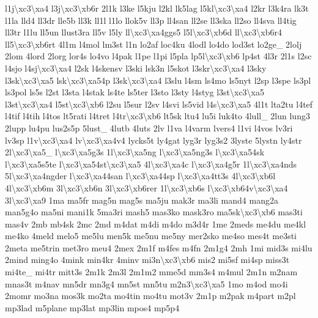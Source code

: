 \begin{DoxyCompactItemize}
l1j\textbackslash{}xc3\textbackslash{}xa4 l3j\textbackslash{}xc3\textbackslash{}xb6r 2l1k l3ke l5kju l2kl lk5lag l5kl\textbackslash{}xc3\textbackslash{}xa4 l2kr l3k4ra lk3t l1la lld4 ll3dr lle5b ll3k ll1l l1lo llok5v ll3p ll4san ll2se ll3ska ll2so ll4sva ll4tig ll3tr l1lu ll5un llust3ra ll5v l5ly ll\textbackslash{}xc3\textbackslash{}xa4ggs5 l5l\textbackslash{}xc3\textbackslash{}xb6d ll\textbackslash{}xc3\textbackslash{}xb6r4 ll5\textbackslash{}xc3\textbackslash{}xb6rt 4l1m l4mol lm3st l1n lo2af loc4ku 4lodl lo4do lod3st lo2ge\-\_\- 2lolj 2lom 4lord 2lorg lor4s lo4vo l4pak l1pe l1pi l5pla lp5l\textbackslash{}xc3\textbackslash{}xb6 lp4st 4l3r 2l1s l2sc l4sjo l4sj\textbackslash{}xc3\textbackslash{}xa4 l2sk l4skensv l3ski lsk3n l5skot l3skr\textbackslash{}xc3\textbackslash{}xa4 l3sky l3sk\textbackslash{}xc3\textbackslash{}xa5 lsk\textbackslash{}xc3\textbackslash{}xa54p l3sk\textbackslash{}xc3\textbackslash{}xa4 l3slu l4sm ls4mo ls5nyt l2sp l3spe ls3pl ls3pol ls5s l2st l3sta l4stak ls4te ls5ter l3sto l3sty l4styg l3st\textbackslash{}xc3\textbackslash{}xa5 l3st\textbackslash{}xc3\textbackslash{}xa4 l5st\textbackslash{}xc3\textbackslash{}xb6 l2su l5sur l2sv l4svi ls5vid l4s\textbackslash{}xc3\textbackslash{}xa5 4l1t lta2tu l4tef l4tif l4tih l4tos lt5rati l4tret l4tr\textbackslash{}xc3\textbackslash{}xb6 lt5sk ltu4 lu5i luk4to 4lull\-\_\- 2lun lung3 2lupp lu4pu lus2s5p 5lust\-\_\- 4lutb 4luts 2lv l1va l4varm lvers4 l1vi l4vos lv3ri lv3sp l1v\textbackslash{}xc3\textbackslash{}xa4 lv\textbackslash{}xc3\textbackslash{}xa4v4 lycks5t ly4gat lyg3r lyg3s2 3lyste 5lystn ly4str 2l\textbackslash{}xc3\textbackslash{}xa5\-\_\- l\textbackslash{}xc3\textbackslash{}xa5g3s 1l\textbackslash{}xc3\textbackslash{}xa5ng l\textbackslash{}xc3\textbackslash{}xa5ng3s l\textbackslash{}xc3\textbackslash{}xa54sk l\textbackslash{}xc3\textbackslash{}xa5s5te l\textbackslash{}xc3\textbackslash{}xa54st\textbackslash{}xc3\textbackslash{}xa5 4l\textbackslash{}xc3\textbackslash{}xa4c l\textbackslash{}xc3\textbackslash{}xa4g5r 1l\textbackslash{}xc3\textbackslash{}xa4nds 5l\textbackslash{}xc3\textbackslash{}xa4ngder l\textbackslash{}xc3\textbackslash{}xa44san l\textbackslash{}xc3\textbackslash{}xa44sp l\textbackslash{}xc3\textbackslash{}xa4tt3s 4l\textbackslash{}xc3\textbackslash{}xb6l 4l\textbackslash{}xc3\textbackslash{}xb6m 3l\textbackslash{}xc3\textbackslash{}xb6n 3l\textbackslash{}xc3\textbackslash{}xb6rer 1l\textbackslash{}xc3\textbackslash{}xb6s l\textbackslash{}xc3\textbackslash{}xb64v\textbackslash{}xc3\textbackslash{}xa4 3l\textbackslash{}xc3\textbackslash{}xa9 1ma ma5fr mag5n mag5s ma5ju mak3r ma3li mand4 mang2a man5g4o ma5ni mani1k 5ma3ri mash5 mas3ko mask3ro ma5sk\textbackslash{}xc3\textbackslash{}xb6 mas3ti mas4v 2mb mb4sk 2mc 2md m4dat m4di m4do m3d4r 1me 2meds me4du me4kl me4ko 4meld melo5 me5lu men5k me5nu me5ny mer2sko me4so mes4t me3sti 2meta me5trin met3ro meu4 2mex 2m1f m4fes m4fn 2m1g4 2mh 1mi mid3s mi4lu 2mind ming4o 4mink min4kr 4minv mi3n\textbackslash{}xc3\textbackslash{}xb6 mis2 mi5sf mi4sp miss3t mi4te\-\_\- mi4tr mitt3s 2m1k 2m3l 2m1m2 mme5d mm3s4 m4mul 2m1n m2nam mnas3t m4nav mn5dr mn3g4 mn5st mn5tu m2n3\textbackslash{}xc3\textbackslash{}xa5 1mo m4od mo4i 2momr mo3na mos3k mo2ta mo4tin mo4tu mot3v 2m1p m2pak m4part m2pl mp3lad m5plane mp3lat mp3lin mpos4 mp5p4 
\end{DoxyCompactItemize}
